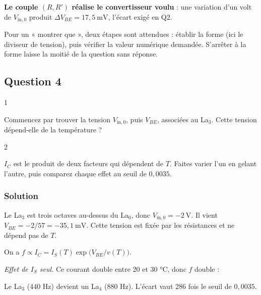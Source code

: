 \documentclass[11pt,a4paper]{article}
\newcommand{\equationajustee}[1]{%
  \sbox{\boiteequation}{$\displaystyle #1$}%
  \ifdim\wd\boiteequation>\linewidth
    \[\resizebox{\linewidth}{!}{\usebox{\boiteequation}}\]%
  \else
    \[#1\]%
  \fi}
\begin{document}
\textbf{Le couple \((R,R')\) réalise le convertisseur voulu} : une variation d'un volt de \(V_{\mathrm{in},0}\) produit \(\Delta V_{BE}=17{,}5\ \mathrm{mV}\), l'écart exigé en Q2.

\begin{jury}

Pour un « montrer que », deux étapes sont attendues : établir la forme (ici le diviseur de tension), puis vérifier la valeur numérique demandée. S'arrêter à la forme laisse la moitié de la question sans réponse.

\end{jury}

\hypertarget{question-4}{%
\subsection{Question 4}\label{question-4}}

\begin{indication}{1}

Commencez par trouver la tension \(V_{\mathrm{in},0}\), puis \(V_{BE}\), associées au La\(_3\). Cette tension dépend-elle de la température ?

\end{indication}

\begin{indication}{2}

\(I_C\) est le produit de deux facteurs qui dépendent de \(T\). Faites varier l'un en gelant l'autre, puis comparez chaque effet au seuil de \(0{,}0035\).

\end{indication}

\hypertarget{solution-3}{%
\subsubsection{Solution}\label{solution-3}}

Le La\(_3\) est trois octaves au-dessus du La\(_0\), donc \(V_{\mathrm{in},0}=-2\ \mathrm{V}\). Il vient \(V_{BE}=-2/57=-35{,}1\ \mathrm{mV}\). Cette tension est fixée par les résistances et ne dépend pas de \(T\).

On a \(f\propto I_C=I_S(T)\exp\big(V_{BE}/v(T)\big)\).

\emph{Effet de \(I_S\) seul.} Ce courant double entre 20 et 30 °C, donc \(f\) double :

\equationajustee{\boxed{\frac{\Delta f}{f}\Big|_{I_S}=+100\ \%}}

Le La\(_3\) (440 Hz) devient un La\(_4\) (880 Hz). L'écart vaut 286 fois le seuil de \(0{,}0035\).
\end{document}
